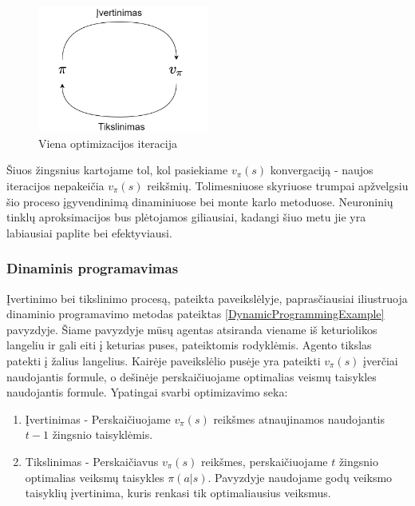\documentclass[a4paper, 12pt]{article}
\begin{document}
\begin{figure}[h]
\centering
\includegraphics[width=0.5\textwidth]{policyIteration}
\caption{Viena optimizacijos iteracija }
\label{policyIteration}
\end{figure}

Šiuos žingsnius kartojame tol, kol pasiekiame $v_{\pi}(s)$ konvergaciją - naujos iteracijos nepakeičia $v_{\pi}(s)$ reikšmių. Tolimesniuose skyriuose trumpai apžvelgsiu šio proceso įgyvendinimą dinaminiuose bei monte karlo metoduose. Neuroninių tinklų aproksimacijos bus plėtojamos giliausiai, kadangi šiuo metu jie yra labiausiai paplite bei efektyviausi.

\subsubsection{Dinaminis programavimas}

Įvertinimo bei tikslinimo procesą, pateikta \label{policyIteration} paveikslėlyje, paprasčiausiai iliustruoja dinaminio programavimo metodas pateiktas \ref{DynamicProgrammingExample} pavyzdyje. Šiame pavyzdyje mūsų agentas atsiranda viename iš keturiolikos langeliu ir gali eiti į keturias puses, pateiktomis rodyklėmis. Agento tikslas patekti į žalius langelius. Kairėje paveikslėlio pusėje yra pateikti $v_{\pi}(s)$ įverčiai naudojantis \label{eqn:tiketinaReiksme} formule, o dešinėje perskaičiuojame optimalias veismų taisykles naudojantis \label{eqn:greedyPolicy} formule. Ypatingai svarbi optimizavimo seka:

\begin{enumerate}
  \addtolength{\itemsep}{-0.5\baselineskip} 
  \item Įvertinimas - Perskaičiuojame $v_{\pi}(s)$ reikšmes atnaujinamos naudojantis $t-1$ žingsnio taisyklėmis.
  \item Tikslinimas - Perskaičiavus $v_{\pi}(s)$ reikšmes, perskaičiuojame $t$ žingsnio optimalias veiksmų taisykles $\pi(a|s)$. Pavyzdyje naudojame godų veiksmo taisyklių įvertinima, kuris renkasi tik optimaliausius veiksmus.
\end{enumerate}
\end{document}
